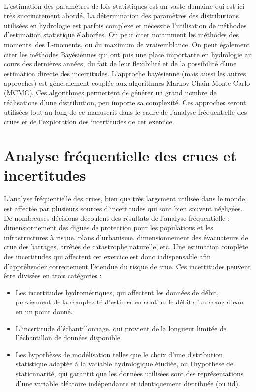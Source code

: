 \documentclass[11pt]{article}
\begin{document}
	\paragraph{} L'estimation des paramètres de lois statistiques est un vaste domaine qui est ici très succinctement abordé. 	La détermination des paramètres des distributions utilisées en hydrologie est parfois complexe et nécessite l'utilisation de méthodes d'estimation statistique élaborées. On peut citer notamment les méthodes des moments, des L-moments, ou du maximum de vraisemblance. On peut également citer les méthodes Bayésiennes qui ont pris une place importante en hydrologie au cours des dernières années, du fait de leur flexibilité et de la possibilité d'une estimation directe des incertitudes. L'approche bayésienne (mais aussi les autres approches) est généralement couplée aux algorithmes Markov Chain Monte Carlo (MCMC). Ces algorithmes permettent de générer un grand nombre de réalisations d'une distribution, peu importe sa complexité. Ces approches seront utilisées tout au long de ce manuscrit dans le cadre de l'analyse fréquentielle des crues et de l'exploration des incertitudes de cet exercice. 

	\section{Analyse fréquentielle des crues et incertitudes}
	
	\paragraph{} L'analyse fréquentielle des crues, bien que très largement utilisée dans le monde, est affectée par plusieurs sources d'incertitudes qui sont bien souvent négligées. De nombreuses décisions découlent des résultats de l'analyse fréquentielle : dimensionnement des digues de protection pour les populations et les infrastructures à risque, plans d'urbanisme, dimensionnement des évacuateurs de crue des barrages, arrêtés de catastrophe naturelle, etc. Une estimation complète des incertitudes qui affectent cet exercice est donc indispensable afin d'appréhender correctement l'étendue du risque de crue. Ces incertitudes peuvent être divisées en trois catégories :
	\begin{itemize}
	
		\item Les incertitudes hydrométriques, qui affectent les données de débit, proviennent de la complexité d'estimer en continu le débit d'un cours d'eau en un point donné.
		
		\item L'incertitude d'échantillonnage, qui provient de la longueur limitée de l'échantillon de données disponible.

		\item Les hypothèses de modélisation telles que le choix d'une distribution statistique adaptée à la variable hydrologique étudiée, ou l'hypothèse de stationnarité, qui garantit que les données utilisées sont des représentations d'une variable aléatoire indépendante et identiquement distribuée (ou iid).
	\end{itemize}
	
\end{document}
